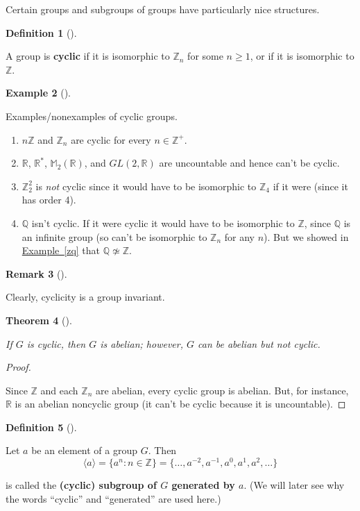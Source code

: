 \documentclass[10pt,]{book}
\newcommand{\terminology}[1]{\textbf{#1}}
\theoremstyle{plain}
\newtheorem{theorem}{Theorem}[section]
\theoremstyle{definition}
\newtheorem{definition}[theorem]{Definition}
\theoremstyle{definition}
\newtheorem{remark}[theorem]{Remark}
\theoremstyle{definition}
\newtheorem{example}[theorem]{Example}
\theoremstyle{definition}
\numberwithin{equation}{section}
\def\Z{\mathbb{Z}}
\def\R{\mathbb{R}}
\def\Q{\mathbb{Q}}
\def\M{\mathbb{M}}
\begin{document}
    Certain groups and subgroups of groups have particularly nice structures.
\begin{definition}[{}]\label{definition-36}

        A group is \terminology{cyclic} if it is isomorphic to \(\Z_n\) for some \(n\geq 1\), or if it is isomorphic to \(\Z\).
\end{definition}
\begin{example}[]\label{example-44}

        Examples/nonexamples of cyclic groups.
        \leavevmode%
\begin{enumerate}
\item\hypertarget{li-243}{}
              \(n\Z\) and \(\Z_n\) are cyclic for every \(n\in \Z^+\).
\item\hypertarget{li-244}{}
              \(\R\), \(\R^*\), \(\M_2(\R)\), and \(GL(2,\R)\) are uncountable and hence can't be cyclic.
\item\hypertarget{li-245}{}
              \(\Z_2^2\) is \emph{not} cyclic since it would have to be isomorphic to \(\Z_4\) if it were (since it has order 4).
\item\hypertarget{li-246}{}
              \(\Q\) isn't cyclic. If it were cyclic it would have to be isomorphic to \(\Z\), since \(\Q\)
              is an infinite group (so can't be isomorphic to \(\Z_n\) for any \(n\)). But we showed in \hyperref[zq]{Example~\ref{zq}} that \(\Q \not\simeq \Z\).
\end{enumerate}

\end{example}
\begin{remark}[]\label{remark-20}

      Clearly, cyclicity is a group invariant.
\end{remark}
\begin{theorem}[{}]\label{abcyc}

        If \(G\) is cyclic, then \(G\) is abelian; however, \(G\)
        can be abelian but not cyclic.
\end{theorem}
\begin{proof}\hypertarget{proof-20}{}

      Since \(\Z\) and each \(\Z_n\) are abelian, every cyclic group is abelian. But, for instance, \(\R\) is an abelian noncyclic group (it can't be cyclic because it is uncountable).
\end{proof}
\begin{definition}[{}]\label{definition-37}

        Let \(a\) be an element of a group \(G\). Then
\begin{equation*}

          \langle a\rangle  = \{a^n:n\in \Z\}=\{\ldots, a^{-2},a^{-1},a^0,a^1,a^2,\ldots\}
        
\end{equation*}

        is called the \terminology{(cyclic) subgroup of \(G\) generated by \(a\)}.
        (We will later see why the words ``cyclic'' and
        ``generated'' are used here.)
\label{notation-53}
\end{definition}
\end{document}
